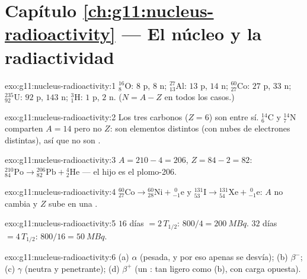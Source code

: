 \section*{Capítulo \ref{ch:g11:nucleus-radioactivity} --- El núcleo y la radiactividad}

\begin{solution}{exo:g11:nucleus-radioactivity:1}
${}^{16}_{8}\mathrm{O}$: $8$ p, $8$ n; ${}^{27}_{13}\mathrm{Al}$: $13$
p, $14$ n; ${}^{60}_{27}\mathrm{Co}$: $27$ p, $33$ n;
${}^{235}_{92}\mathrm{U}$: $92$ p, $143$ n; ${}^{3}_{1}\mathrm{H}$: $1$
p, $2$ n. ($N = A - Z$ en todos los casos.)
\end{solution}

\begin{solution}{exo:g11:nucleus-radioactivity:2}
Los tres carbonos ($Z = 6$) son  entre sí.
${}^{14}_{6}\mathrm{C}$ y ${}^{14}_{7}\mathrm{N}$ comparten $A = 14$
pero no $Z$: son elementos distintos (con nubes de electrones
distintas), así que no son .
\end{solution}

\begin{solution}{exo:g11:nucleus-radioactivity:3}
$A = 210 - 4 = 206$, $Z = 84 - 2 = 82$:
${}^{210}_{84}\mathrm{Po} \to {}^{206}_{82}\mathrm{Pb} +
{}^{4}_{2}\mathrm{He}$ --- el hijo es el plomo-206.
\end{solution}

\begin{solution}{exo:g11:nucleus-radioactivity:4}
${}^{60}_{27}\mathrm{Co} \to {}^{60}_{28}\mathrm{Ni} +
{}^{\;0}_{-1}\mathrm{e}$ y
${}^{131}_{53}\mathrm{I} \to {}^{131}_{54}\mathrm{Xe} +
{}^{\;0}_{-1}\mathrm{e}$: $A$ no cambia y $Z$ sube en una .
\end{solution}

\begin{solution}{exo:g11:nucleus-radioactivity:5}
$16$ días $= 2\,T_{1/2}$: $800/4 = \qty{200}{MBq}$. $32$ días
$= 4\,T_{1/2}$: $800/16 = \qty{50}{MBq}$.
\end{solution}

\begin{solution}{exo:g11:nucleus-radioactivity:6}
(a) $\alpha$ (pesada, y por eso apenas se desvía); (b) $\beta^-$; (c)
$\gamma$ (neutra y penetrante); (d) $\beta^+$ (un : tan ligero
como (b), con carga opuesta).
\end{solution}

